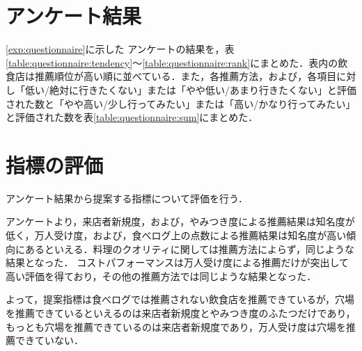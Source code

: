 	\section{アンケート結果}
	\ref{exp:questionnaire}に示した
	アンケートの結果を，表\ref{table:questionnaire:tendency}〜\ref{table:questionnaire:rank}にまとめた．表内の飲食店は推薦順位が高い順に並べている．また，各推薦方法，および，各項目に対し「低い/絶対に行きたくない」または「やや低い/あまり行きたくない」と評価された数と「やや高い/少し行ってみたい」または「高い/かなり行ってみたい」と評価された数を表\ref{table:questionnaire:sum}にまとめた．
	
	
	
	
	
	
	
	\newpage

\section{指標の評価}
アンケート結果から提案する指標について評価を行う．\par
アンケートより，来店者新規度，および，やみつき度による推薦結果は知名度が低く，万人受け度，および，食べログ上の点数による推薦結果は知名度が高い傾向にあるといえる．料理のクオリティに関しては推薦方法によらず，同じような結果となった．
コストパフォーマンスは万人受け度による推薦だけが突出して高い評価を得ており，その他の推薦方法では同じような結果となった．%
\par
よって，提案指標は食べログでは推薦されない飲食店を推薦できているが，穴場を推薦できているといえるのは来店者新規度とやみつき度のふたつだけであり，もっとも穴場を推薦できているのは来店者新規度であり，万人受け度は穴場を推薦できていない．
